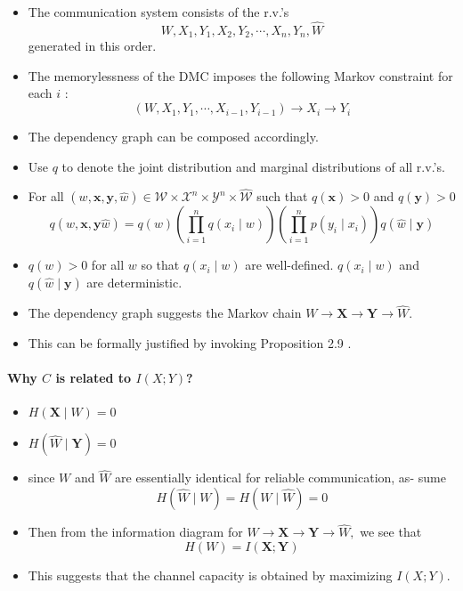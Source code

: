 \documentclass[8pt]{article}
\begin{document}
\begin{itemize}
	\item The communication system consists of the r.v.'s
	$$
	W, X_{1}, Y_{1}, X_{2}, Y_{2}, \cdots, X_{n}, Y_{n}, \hat{W}
	$$
	generated in this order.
	\item The memorylessness of the DMC imposes the following Markov constraint for each $i$ :
	$$
	\left(W, X_{1}, Y_{1}, \cdots, X_{i-1}, Y_{i-1}\right) \rightarrow X_{i} \rightarrow Y_{i}
	$$
	\item The dependency graph can be composed accordingly.
	\item Use $q$ to denote the joint distribution and marginal distributions of all
	r.v.'s.
	\item For all $(w, \mathbf{x}, \mathbf{y}, \hat{w}) \in \mathcal{W} \times \mathcal{X}^{n} \times \mathcal{Y}^{n} \times \hat{\mathcal{W}}$ such that $q(\mathbf{x})>0$ and $q(\mathbf{y})>0$
	$$
	q(w, \mathbf{x}, \mathbf{y} \hat{w})=q(w)\left(\prod_{i=1}^{n} q\left(x_{i} \mid w\right)\right)\left(\prod_{i=1}^{n} p\left(y_{i} \mid x_{i}\right)\right) q(\hat{w} \mid \mathbf{y})
	$$
	\item $q(w)>0$ for all $w$ so that $q\left(x_{i} \mid w\right)$ are well-defined.
	$q\left(x_{i} \mid w\right)$ and $q(\hat{w} \mid \mathbf{y})$ are deterministic.
	\item The dependency graph suggests the Markov chain $W \rightarrow \mathbf{X} \rightarrow \mathbf{Y} \rightarrow \hat{W}$.
	\item This can be formally justified by invoking Proposition 2.9 .
\end{itemize}

\paragraph{Why $C$ is related to $I(X;Y)$?}
\begin{itemize}
	\item $H(\mathbf{X} \mid W)=0$
	\item $H(\hat{W} \mid \mathbf{Y})=0$
	\item since $W$ and $\hat{W}$ are essentially identical for reliable communication, as-
	sume
	$$
	H(\hat{W} \mid W)=H(W \mid \hat{W})=0
	$$
	\item Then from the information diagram for $W \rightarrow \mathbf{X} \rightarrow \mathbf{Y} \rightarrow \hat{W},$ we see that
	$$
	H(W)=I(\mathbf{X} ; \mathbf{Y})
	$$
	\item This suggests that the channel capacity is obtained by maximizing $I(X ; Y)$.
\end{itemize}
\end{document}
